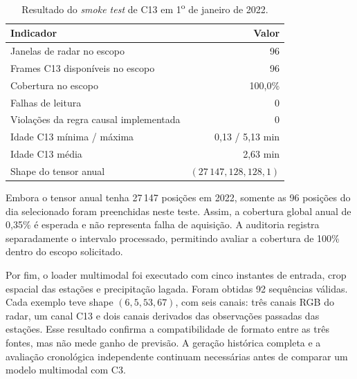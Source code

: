 \begin{table}[htbp]
\centering
\caption{Resultado do \emph{smoke test} de C13 em 1\textsuperscript{o} de janeiro de 2022.}
\label{tab:smoke-c13-2022}
\begin{tabular}{lr}
\toprule
\textbf{Indicador} & \textbf{Valor} \\
\midrule
Janelas de radar no escopo & 96 \\
Frames C13 disponíveis no escopo & 96 \\
Cobertura no escopo & 100,0\% \\
Falhas de leitura & 0 \\
Violações da regra causal implementada & 0 \\
Idade C13 mínima / máxima & 0,13 / 5,13 min \\
Idade C13 média & 2,63 min \\
Shape do tensor anual & $(27\,147, 128, 128, 1)$ \\
\bottomrule
\end{tabular}
\end{table}

Embora o tensor anual tenha 27\,147 posições em 2022, somente as 96 posições do dia selecionado foram preenchidas neste teste. Assim, a cobertura global anual de 0,35\% é esperada e não representa falha de aquisição. A auditoria registra separadamente o intervalo processado, permitindo avaliar a cobertura de 100\% dentro do escopo solicitado.

Por fim, o loader multimodal foi executado com cinco instantes de entrada, crop espacial das estações e precipitação lagada. Foram obtidas 92 sequências válidas. Cada exemplo teve shape $(6, 5, 53, 67)$, com seis canais: três canais RGB do radar, um canal C13 e dois canais derivados das observações passadas das estações. Esse resultado confirma a compatibilidade de formato entre as três fontes, mas não mede ganho de previsão. A geração histórica completa e a avaliação cronológica independente continuam necessárias antes de comparar um modelo multimodal com C3.
